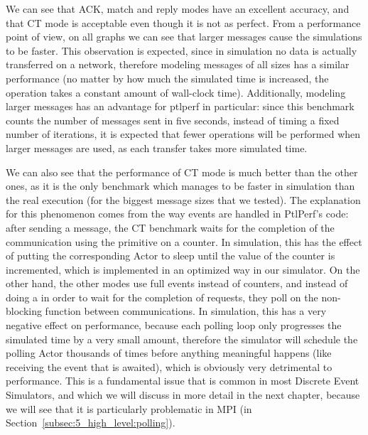 We can see that ACK, match and reply modes have an excellent accuracy, and that
CT mode is acceptable even though it is not as perfect. From a performance point
of view, on all graphs we can see that larger messages cause the simulations to
be faster. This observation is expected, since in simulation no data is actually
transferred on a network, therefore modeling messages of all sizes has a similar
performance (no matter by how much the simulated time is increased, the
operation takes a constant amount of wall-clock time). Additionally, modeling
larger messages has an advantage for ptlperf in particular: since this benchmark
counts the number of messages sent in five seconds, instead of timing a fixed
number of iterations, it is expected that fewer operations will be performed
when larger messages are used, as each transfer takes more simulated time. 

We can also see that the performance of CT mode is much better than the other
ones, as it is the only benchmark which manages to be faster in simulation than
the real execution (for the biggest message sizes that we tested). The
explanation for this phenomenon comes from the way events are handled in
PtlPerf's code: after sending a message, the CT benchmark waits for the
completion of the communication using the  primitive on a
counter. In simulation, this has the effect of putting the corresponding Actor
to sleep until the value of the counter is incremented, which is implemented in
an optimized way in our simulator. On the other hand, the other modes use full
events instead of counters, and instead of doing a  in order
to wait for the completion of requests, they poll on the non-blocking
 function between communications. In simulation, this has a
very negative effect on performance, because each polling loop only progresses
the simulated time by a very small amount, therefore the simulator will schedule
the polling Actor thousands of times before anything meaningful happens (like
receiving the event that is awaited), which is obviously very detrimental to
performance. This is a fundamental issue that is common in most Discrete Event
Simulators, and which we will discuss in more detail in the next chapter,
because we will see that it is particularly problematic in MPI (in
Section~\ref{subsec:5_high_level:polling}).
